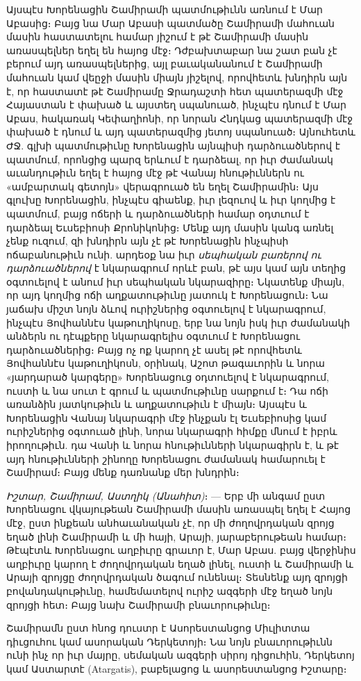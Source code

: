 \documentclass{article}
\begin{document}
{Այսպէս Խորենացին Շամիրամի պատմութիւնն առնում է Մար Աբասից։ Բայց նա Մար Աբասի պատմածը Շամիրամի մահուան մասին հաստատելու համար յիշում է թէ Շամիրամի մասին առասպելներ եղել են հայոց մէջ։ Դժբախտաբար նա շատ բան չէ բերում այդ առասպելներից, այլ բաւականանում է Շամիրամի մահուան կամ վեըջի մասին միայն յիշելով, որովհետև խնդիրն այն է, որ հաստատէ թէ Շամիրամը Ջրադաշտի հետ պատերազմի մէջ Հայաստան է փախած և այստեղ սպանուած, ինչպէս դնում է Մար Աբաս, հակառակ Կեփաղիոնի, որ նորան Հնդկաց պատերազմի մէջ փախած է դնում և այդ պատերազմից յետոյ սպանուած։ Այնուհետև ԺՋ. գլխի պատմութիւնը Խորենացին այնպիսի դարձուածներով է պատմում, որոնցից պարզ երևում է դարձեալ, որ իւր ժամանակ աւանդութիւն եղել է հայոց մէջ թէ Վանայ հնութիւններն ու «ամբարտակ գետոյն» վերագրուած են եղել Շամիրամին։ Այս գլուխը Խորենացին, ինչպէս գիաենք, իւր լեզուով և իւր կողմից է պատմում, բայց ոճերի և դարձուածների համար օդտւում է դարձեալ Եւսեբիոսի Քրոնիկոնից։ Մենք այդ մասին կանգ առնել չենք ուզում, զի խնդիրն այն չէ թէ Խորենացին ինչպիսի ոճաբանութիւն ունի. արդեօք նա իւր \emph{սեպհական բառերով ու դարձուածներով} է նկարագրում որևէ բան, թէ այս կամ այն տեղից օգտուելով է անում իւր սեպհական նկարազիրը։ Նկատենք միայն, որ այդ կողմից ոճի աղքատութիւնը յատուկ է Խորենացուն։ Նա յաճախ միշտ նոյն ձևով ուրիշներից օգտուելով է նկարագրում, ինչպէս Յովհաննէս կաթուղիկոսը, երբ նա նոյն իսկ իւր ժամանակի անձերն ու դէպքերը նկարագրելիս օգտւում է Խորենացու դարձուածներից։ Բայց ոչ ոք կարող չէ ասել թէ որովհետև Յովհաննէս կաթուղիկոսն, օրինակ, Աշոտ թագաւորին և նորա «յարդարած կարգերը» Խորենացուց օդտուելով է նկարագրում, ուստի և նա սուտ է գրում և պատմութիւնը սարքում է։ Դա ոճի առանձին յատկութիւն և աղքատութիւն է միայն։ Այսպէս և Խորենացին Վանայ նկարագրի մէջ ինչքան էլ Եւսեբիոսից կամ ուրիշներից օգտուած լինի, նորա նկարագրի հիմքը մնում է իբրև իրողութիւն. դա Վանի և նորա հնութիւնների նկարագիրն է, և թէ այդ հնութիւնների շինողը Խորենացու ժամանակ համարուել է Շամիրամ։ Բայց մենք դառնանք մեր խնդրին։

\emph{Իշտար, Շամիրամ, Աստղիկ (Անահիտ)}։ — Երբ մի անգամ ըստ Խորենացու վկայութեան Շամիրամի մասին առասպել եղել է Հայոց մէջ, ըստ ինքեան անհաւանական չէ, որ մի ժողովրդական զրոյց եղած լինի Շամիրամի և մի հայի, Արայի, յարաբերութեան համար։ Թէպէտև Խորենացու աղբիւրը գրաւոր է, Մար Աբաս. բայց վերջինիս աղբիւրը կարող է ժողովրդական եղած լինել, ուստի և Շամիրամի և Արայի զրոյցը ժողովրդական ծագում ունենալ։ Տեսնենք այդ զրոյցի բովանդակութիւնը, համեմատելով ուրիշ ազգերի մէջ եղած նոյն զրոյցի հետ։ Բայց նախ Շամիրամի բնաւորութիւնը։

Շամիրամն ըստ հնոց դուստր է Ասորեստանցոց Միւլիտտա դիւցուհու կամ ասորական Դերկետոյի։ Նա նոյն բնաւորութիւնն ունի ինչ որ իւր մայրը, սեմական ազգերի սիրոյ դիցուհին, Դերկետոյ կամ Աստարտէ (Atargatis), բաբելացոց և ասորեստանցոց Իշտարը։

}
\end{document}
